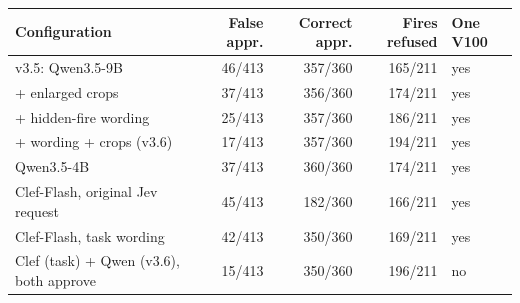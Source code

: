 \begin{tabular}{lrrrl}
\toprule
Configuration & False appr. & Correct appr. & Fires refused & One V100 \\
\midrule
v3.5: Qwen3.5-9B & 46/413 & 357/360 & 165/211 & yes \\
+ enlarged crops & 37/413 & 356/360 & 174/211 & yes \\
+ hidden-fire wording & 25/413 & 357/360 & 186/211 & yes \\
+ wording + crops (v3.6) & 17/413 & 357/360 & 194/211 & yes \\
Qwen3.5-4B & 37/413 & 360/360 & 174/211 & yes \\
Clef-Flash, original Jev request & 45/413 & 182/360 & 166/211 & yes \\
Clef-Flash, task wording & 42/413 & 350/360 & 169/211 & yes \\
Clef (task) + Qwen (v3.6), both approve & 15/413 & 350/360 & 196/211 & no \\
\bottomrule
\end{tabular}

